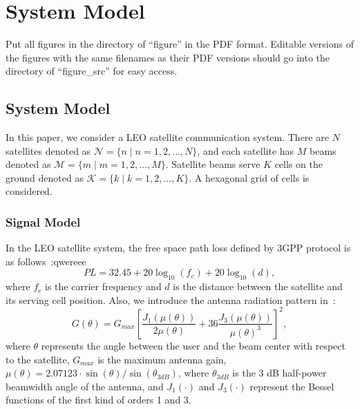 \chapter{System Model}
\label{chap:model}

Put all figures in the directory of ``figure'' in the PDF format. Editable versions of
the figures with the same filenames as their PDF versions should go into the directory of 
``figure\_src'' for easy access.

\section{System Model}
In this paper, we consider a LEO satellite communication system. There are $N$ satellites denoted as $\mathcal{N} = \{n \mid n = 1, 2, \ldots, N\}$, and each satellite has $M$ beams denoted as $\mathcal{M} = \{m \mid m = 1, 2, \ldots, M\}$. Satellite beams serve $K$ cells on the ground denoted as $\mathcal{K} = \{k \mid k = 1, 2, \ldots, K\}$. A hexagonal grid of cells is considered.

\subsection{Signal Model}
In the LEO satellite system, the free space path loss defined by 3GPP protocol is as follows~\cite{38811}:qwereee
\begin{equation}
PL = 32.45 + 20\log_{10}(f_c) + 20\log_{10}(d),
\end{equation}
where $f_c$ is the carrier frequency and $d$ is the distance between the satellite and its serving cell position.
Also, we introduce the antenna radiation pattern in~\cite{Energy-Efficient}:
\begin{equation}
G(\theta) = G_{max} \left[ \frac{J_1\left(\mu(\theta)\right)}{2\mu(\theta)} 
+ 36 \frac{J_3\left(\mu(\theta)\right)}{\mu(\theta)^3} \right]^2,
\end{equation}
where $\theta$ represents the angle between the user and the beam center with respect to the satellite, $G_{max}$ is the maximum antenna gain, $\mu(\theta) = 2.07123\cdot \sin(\theta)/\sin(\theta_{3dB})$, where $\theta_{3dB}$ is the 3 dB half-power beamwidth angle of the antenna, and $J_1(\cdot)$ and $J_3(\cdot)$ represent the Bessel functions of the first kind of orders 1 and 3.

